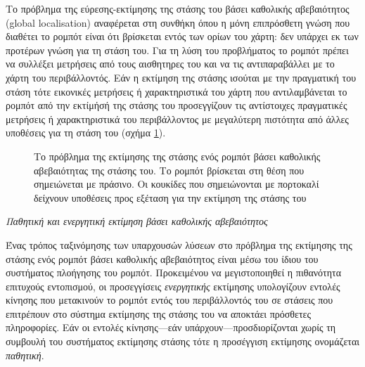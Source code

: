 Το πρόβλημα της εύρεσης-εκτίμησης της στάσης του βάσει καθολικής αβεβαιότητος
(global localisation) αναφέρεται στη συνθήκη όπου η μόνη επιπρόσθετη γνώση που
διαθέτει το ρομπότ είναι ότι βρίσκεται εντός των ορίων του χάρτη: δεν υπάρχει
εκ των προτέρων γνώση για τη στάση του. Για τη λύση του προβλήματος το ρομπότ
πρέπει να συλλέξει μετρήσεις από τους αισθητηρες του και να τις αντιπαραβάλλει
με το χάρτη του περιβάλλοντός. Εάν η εκτίμηση της στάσης ισούται με την
πραγματική του στάση τότε εικονικές μετρήσεις ή χαρακτηριστικά του χάρτη που
αντιλαμβάνεται το ρομπότ από την εκτίμήσή της στάσης του προσεγγίζουν τις
αντίστοιχες πραγματικές μετρήσεις ή χαρακτηριστικά του περιβάλλοντος με
μεγαλύτερη πιστότητα από άλλες υποθέσεις για τη στάση του (σχήμα
\ref{fig:global_localisation}).

\begin{figure}[htbp]\centering
  
  \caption{\small Το πρόβλημα της εκτίμησης της στάσης ενός ρομπότ βάσει καθολικής
           αβεβαιότητας της στάσης του. Το ρομπότ βρίσκεται στη θέση που
           σημειώνεται με πράσινο. Οι κουκίδες που σημειώνονται με πορτοκαλί
           δείχνουν υποθέσεις προς εξέταση για την εκτίμηση της στάσης του}
  \label{fig:global_localisation}
\end{figure}


\begin{bw_box}
\begin{definition}
  \label{definition:01_01_02_02:01}
  \textit{Παθητική και ενεργητική εκτίμηση βάσει καθολικής αβεβαιότητος}

  Ένας τρόπος ταξινόμησης των υπαρχουσών λύσεων στο πρόβλημα
  της εκτίμησης της στάσης ενός ρομπότ βάσει καθολικής αβεβαιότητος είναι μέσω
  του ίδιου του συστήματος πλοήγησης του ρομπότ. Προκειμένου να μεγιστοποιηθεί
  η πιθανότητα επιτυχούς εντοπισμού, οι προσεγγίσεις \textit{ενεργητικής}
  εκτίμησης υπολογίζουν εντολές κίνησης που μετακινούν το ρομπότ εντός του
  περιβάλλοντός του σε στάσεις που επιτρέπουν στο σύστημα εκτίμησης της στάσης
  του να αποκτάει πρόσθετες πληροφορίες. Εάν οι εντολές κίνησης---εάν
  υπάρχουν---προσδιορίζονται χωρίς τη συμβουλή του συστήματος εκτίμησης στάσης
  τότε η προσέγγιση εκτίμησης ονομάζεται \textit{παθητική}.
\end{definition}
\end{bw_box}

